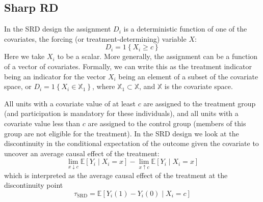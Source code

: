 \documentclass[11pt]{book}%
\begin{document}
 \subsection{Sharp RD} 
In the SRD design the assignment $D_{i}$ is a deterministic function of one of the covariates, the forcing (or treatment-determining) variable $X$:
$$
D_{i}=1\left\{X_{i} \geqslant c\right\}
$$
Here we take $X_{i}$ to be a scalar. More generally, the assignment can be a function of a vector of covariates. Formally, we can write this as the treatment indicator being an indicator for the vector $X_{i}$ being an element of a subset of the covariate space, or
$D_{i}=1\left\{X_{i} \in \mathbb{X}_{1}\right\}$,
where $\mathbb{X}_{1} \subset \mathbb{X}$, and $\mathbb{X}$ is the covariate space.

All units with a covariate value of at least $c$ are assigned to the treatment group (and participation is mandatory for these individuals), and all units with a covariate value less than $c$ are assigned to the control group (members of this group are not eligible for the treatment). In the SRD design we look at the discontinuity in the conditional expectation of the outcome given the covariate to uncover an average causal effect of the treatment:
$$
\lim _{x \downarrow c} \mathbb{E}\left[Y_{i} \mid X_{i}=x\right]-\lim _{x \uparrow c} \mathbb{E}\left[Y_{i} \mid X_{i}=x\right]
$$
which is interpreted as the average causal effect of the treatment at the discontinuity point
$$
\tau_{\mathrm{SRD}}=\mathbb{E}\left[Y_{i}(1)-Y_{i}(0) \mid X_{i}=c\right]
$$
\end{document}
